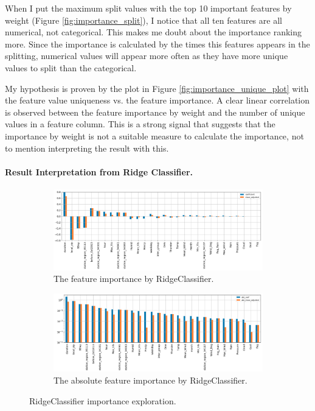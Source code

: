 \documentclass[a4paper]{article}
\begin{document}
			When I put the maximum split values with the top 10 important features by weight (Figure \ref{fig:importance_split}), I notice that all ten features are all numerical, not categorical. This makes me doubt about the importance ranking more. Since the importance is calculated by the times this features appears in the splitting, numerical values will appear more often as they have more unique values to split than the categorical.
			
			My hypothesis is proven by the plot in Figure \ref{fig:importance_unique_plot} with the feature value uniqueness vs. the feature importance. A clear linear correlation is observed between the feature importance by weight and the number of unique values in a feature column. This is a strong signal that suggests that the importance by weight is not a suitable measure to calculate the importance, not to mention interpreting the result with this.
			
			\paragraph{Result Interpretation from Ridge Classifier.}
			
			\begin{figure}
				\centering
				\begin{subfigure}[b]{1\textwidth}
					\centering
					\includegraphics[width=1\textwidth]{FeatureImportanceRidge.png}
					\caption{\label{fig:ridge_importance}The feature importance by RidgeClassifier.}
				\end{subfigure}					
				\begin{subfigure}[b]{1\textwidth}
					\centering
					\includegraphics[width=1\textwidth]{ImportanceRidgeAbs.png}
					\caption{\label{fig:ridge_importance_abs}The absolute feature importance by RidgeClassifier.}		
				\end{subfigure}
				\caption{RidgeClassifier importance exploration.}
				\label{fig:ridge_classifier}
			\end{figure}			
			
\end{document}
